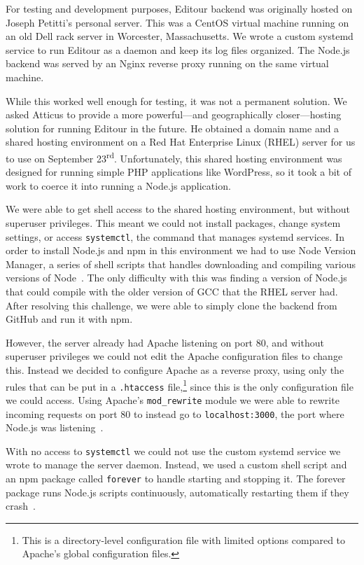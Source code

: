 \documentclass[a4paper, 10pt, american, titlepage]{article}
\begin{document}
For testing and development purposes, Editour backend was originally hosted on
Joseph Petitti's personal server. This was a CentOS virtual machine running on
an old Dell rack server in Worcester, Massachusetts. We wrote a custom systemd
service to run Editour as a daemon and keep its log files organized. The Node.js
backend was served by an Nginx reverse proxy running on the same virtual
machine.

While this worked well enough for testing, it was not a permanent solution. We
asked Atticus to provide a more powerful---and geographically closer---hosting
solution for running Editour in the future. He obtained a domain name and a
shared hosting environment on a Red Hat Enterprise Linux (RHEL) server for us to
use on September 23\textsuperscript{rd}. Unfortunately, this shared hosting
environment was designed for running simple PHP applications like WordPress, so
it took a bit of work to coerce it into running a Node.js application.

We were able to get shell access to the shared hosting environment, but without
superuser privileges. This meant we could not install packages, change system
settings, or access \texttt{systemctl}, the command that manages systemd
services. In order to install Node.js and npm in this environment we had to use
Node Version Manager, a series of shell scripts that handles downloading and
compiling various versions of Node~\autocite{nvmsh2019}.  The only difficulty
with this was finding a version of Node.js that could compile with the older
version of GCC that the RHEL server had. After resolving this challenge, we were
able to simply clone the backend from GitHub and run it with npm.

However, the server already had Apache listening on port 80, and without
superuser privileges we could not edit the Apache configuration files to change
this. Instead we decided to configure Apache as a reverse proxy, using only the
rules that can be put in a \texttt{.htaccess} file,\footnote{This is a
directory-level configuration file with limited options compared to Apache's
global configuration files.} since this is the only configuration file we could
access. Using Apache's \texttt{mod\_rewrite} module we were able to rewrite
incoming requests on port 80 to instead go to \texttt{localhost:3000}, the port
where Node.js was listening~\autocite{apache2019}.

With no access to \texttt{systemctl} we could not use the custom systemd service
we wrote to manage the server daemon. Instead, we used a custom shell script and
an npm package called \texttt{forever} to handle starting and stopping it. The
forever package runs Node.js scripts continuously, automatically restarting them
if they crash~\autocite{robbins2019}.
\end{document}
